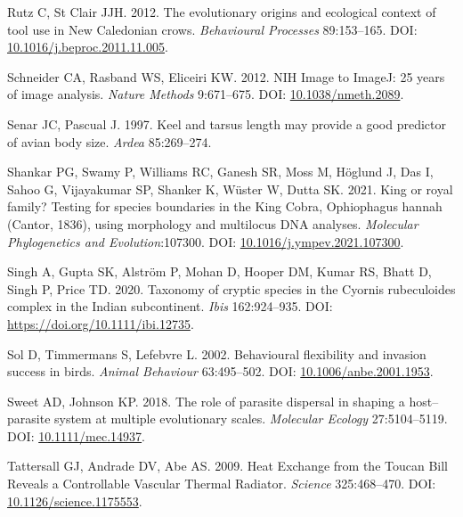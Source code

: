 \documentclass[10pt,a4paper]{article}
\newlength{\cslhangindent}
\newenvironment{CSLReferences}[2] %
 {\begin{list}{}{%
  \setlength{\itemindent}{0pt}
  \setlength{\leftmargin}{0pt}
  \setlength{\parsep}{0pt}
  \ifodd #1
   \setlength{\leftmargin}{\cslhangindent}
   \setlength{\itemindent}{-1\cslhangindent}
  \fi
  \setlength{\itemsep}{#2\baselineskip}}}
 {\end{list}}
\begin{document}
\begin{CSLReferences}{1}{0}
Rutz C, St Clair JJH. 2012. The evolutionary origins and ecological context of tool use in {New} {Caledonian} crows. \emph{Behavioural Processes} 89:153--165. DOI: \href{https://doi.org/10.1016/j.beproc.2011.11.005}{10.1016/j.beproc.2011.11.005}.

Schneider CA, Rasband WS, Eliceiri KW. 2012. {NIH} {Image} to {ImageJ}: 25 years of image analysis. \emph{Nature Methods} 9:671--675. DOI: \href{https://doi.org/10.1038/nmeth.2089}{10.1038/nmeth.2089}.

Senar JC, Pascual J. 1997. Keel and tarsus length may provide a good predictor of avian body size. \emph{Ardea} 85:269--274.

Shankar PG, Swamy P, Williams RC, Ganesh SR, Moss M, Höglund J, Das I, Sahoo G, Vijayakumar SP, Shanker K, Wüster W, Dutta SK. 2021. King or royal family? {Testing} for species boundaries in the {King} {Cobra}, {Ophiophagus} hannah ({Cantor}, 1836), using morphology and multilocus {DNA} analyses. \emph{Molecular Phylogenetics and Evolution}:107300. DOI: \href{https://doi.org/10.1016/j.ympev.2021.107300}{10.1016/j.ympev.2021.107300}.

Singh A, Gupta SK, Alström P, Mohan D, Hooper DM, Kumar RS, Bhatt D, Singh P, Price TD. 2020. Taxonomy of cryptic species in the {Cyornis} rubeculoides complex in the {Indian} subcontinent. \emph{Ibis} 162:924--935. DOI: \url{https://doi.org/10.1111/ibi.12735}.

Sol D, Timmermans S, Lefebvre L. 2002. Behavioural flexibility and invasion success in birds. \emph{Animal Behaviour} 63:495--502. DOI: \href{https://doi.org/10.1006/anbe.2001.1953}{10.1006/anbe.2001.1953}.

Sweet AD, Johnson KP. 2018. The role of parasite dispersal in shaping a host--parasite system at multiple evolutionary scales. \emph{Molecular Ecology} 27:5104--5119. DOI: \href{https://doi.org/10.1111/mec.14937}{10.1111/mec.14937}.

Tattersall GJ, Andrade DV, Abe AS. 2009. Heat {Exchange} from the {Toucan} {Bill} {Reveals} a {Controllable} {Vascular} {Thermal} {Radiator}. \emph{Science} 325:468--470. DOI: \href{https://doi.org/10.1126/science.1175553}{10.1126/science.1175553}.


\end{CSLReferences}
\end{document}
